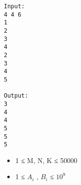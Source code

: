 \begin{verbatim}
Input:
4 4 6
1
2
3
4
2
3
4
5

Output:
3
4
4
5
5
5
\end{verbatim}
\begin{itemize}
	\item     1 ≤ M, N, K ≤ 50000   
	\item     1 ≤ $A_{i}$    , $B_{i}$    ≤ $10^{9}$
\end{itemize}